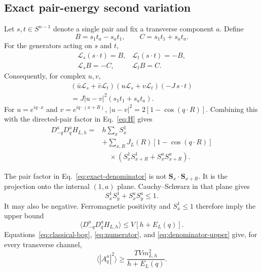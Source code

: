 \documentclass[aps,prb,twocolumn,groupedaddress,amsmath,amssymb,
               superscriptaddress,nofootinbib,floatfix]{revtex4-2}
\theoremstyle{plain}
\theoremstyle{definition}
\begin{document}
\subsection{Exact pair-energy second variation}

Let $s,t\in S^{n-1}$ denote a single pair and fix a transverse component
$a$.  Define
\begin{equation}
 B=s_1t_a-s_at_1,\qquad C=s_1t_1+s_at_a.               \label{eq:B-C}
\end{equation}
For the generators acting on $s$ and $t$,
\begin{equation}
\begin{array}{ll}
 \mathcal L_s(s\cdot t)=B,&
 \mathcal L_t(s\cdot t)=-B,\\[1mm]
 \mathcal L_sB=-C,&
 \mathcal L_tB=C.
\end{array}                                             \label{eq:pair-algebra}
\end{equation}
Consequently, for complex $u,v$,
\begin{multline}
 (\bar u\mathcal L_s+\bar v\mathcal L_t)
 (u\mathcal L_s+v\mathcal L_t)(-J\,s\cdot t)\\
 =
 J|u-v|^2(s_1t_1+s_at_a).                              \label{eq:pair-variation}
\end{multline}
For $u=e^{iq\cdot x}$ and $v=e^{iq\cdot(x+R)}$,
$|u-v|^2=2[1-\cos(q\cdot R)]$.  Combining this with the directed-pair
factor in Eq.~\eqref{eq:H} gives
\begin{align}
 D_{-q}^aD_q^aH_{L,h}
 ={}&h\sum_xS_x^1 \nonumber\\
 &+\sum_{x,R}J_L(R)[1-\cos(q\cdot R)]\nonumber\\
 &\quad\times
 (S_x^1S_{x+R}^1+S_x^aS_{x+R}^a).                    \label{eq:exact-denominator}
\end{align}

The pair factor in Eq.~\eqref{eq:exact-denominator} is not
$\bm S_x\cdot\bm S_{x+R}$.  It is the projection onto the internal
$(1,a)$ plane.  Cauchy--Schwarz in that plane gives
\begin{equation}
 S_x^1S_y^1+S_x^aS_y^a\le1.                            \label{eq:projection-bound}
\end{equation}
It may also be negative.  Ferromagnetic positivity and
$S_x^1\le1$ therefore imply the upper bound
\begin{equation}
 \langle D_{-q}^aD_q^aH_{L,h}\rangle
 \le V[h+E_L(q)].                                      \label{eq:denominator-upper}
\end{equation}
Equations~\eqref{eq:classical-bog}, \eqref{eq:numerator}, and
\eqref{eq:denominator-upper} give, for every transverse channel,
\begin{equation}
 \langle|A_q^a|^2\rangle
 \ge
 \frac{TVm_{L,h}^2}{h+E_L(q)}.                         \label{eq:channel-bound}
\end{equation}
\end{document}

